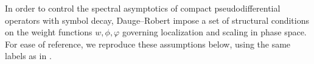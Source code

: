 \documentclass[a4paper,12pt]{article}
\let\originalleft\left
\let\originalright\right
\renewcommand{\left}{\mathopen{}\mathclose\bgroup\originalleft}
\renewcommand{\right}{\aftergroup\egroup\originalright}
\newcommand{\N}{\mathbb{N}}
\newcommand{\R}{\mathbb{R}}
\newcommand{\symbolnot}{\sigma}
\begin{document}



In order to control the spectral asymptotics of compact pseudodifferential
operators with symbol decay, Dauge--Robert impose a set of structural conditions
on the weight functions \(w,\phi,\varphi\) governing localization and scaling in
phase space. For ease of reference, we reproduce these assumptions below, using
the same labels as in \cite{dauge1987weyl}.
\end{document}
